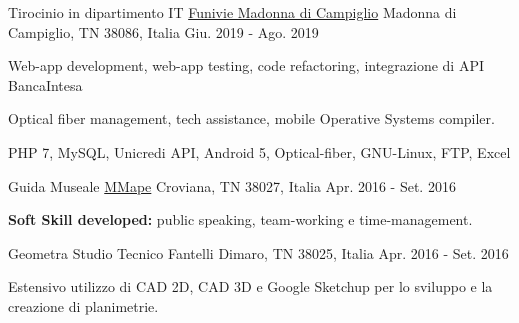 

\begin{cventries}

  \cventry
    {Tirocinio in dipartimento IT} %
    {\href{https://www.funiviecampiglio.it}{Funivie Madonna di Campiglio}} %
    {Madonna di Campiglio, TN 38086, Italia} %
    {Giu. 2019 - Ago. 2019} %
    {
      \begin{cvitems} %
        \item {Web-app development, web-app testing, code refactoring, integrazione di API BancaIntesa}
        \item {Optical fiber management, tech assistance, mobile Operative Systems compiler.}
        \item {PHP 7, MySQL, Unicredi API, Android 5, Optical-fiber, GNU-Linux, FTP, Excel}
      \end{cvitems}
      }
    

  \cventry
    {Guida Museale} %
    {\href{https://www.mmape.it}{MMape}} %
    {Croviana, TN 38027, Italia} %
    {Apr. 2016 - Set. 2016} %
    {
      \begin{cvitems} %
        \item {\textbf{Soft Skill developed:} public speaking, team-working e time-management.}
      \end{cvitems}
    }

  \cventry
    {Geometra} %
    {Studio Tecnico Fantelli} %
    {Dimaro, TN 38025, Italia} %
    {Apr. 2016 - Set. 2016} %
    {
      \begin{cvitems} %
        \item {Estensivo utilizzo di CAD 2D, CAD 3D e Google Sketchup per lo sviluppo e la creazione di planimetrie.}
      \end{cvitems}
    }


\end{cventries}
